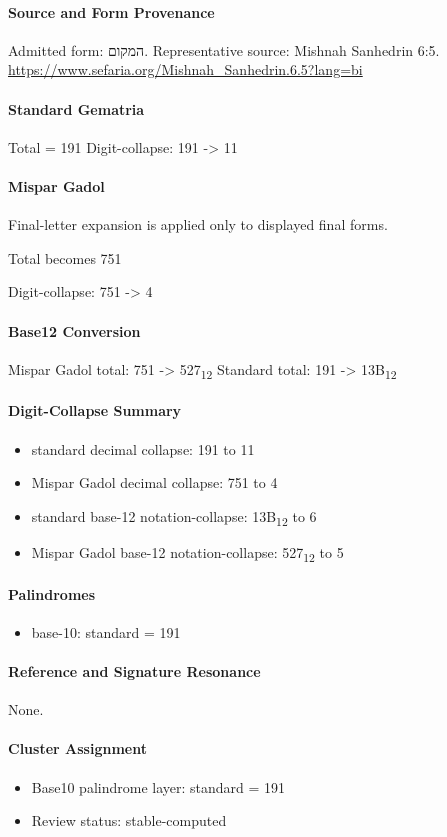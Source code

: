 \paragraph{Source and Form Provenance}
Admitted form: המקום.
Representative source: Mishnah Sanhedrin 6:5.
\url{https://www.sefaria.org/Mishnah_Sanhedrin.6.5?lang=bi}
\paragraph{Standard Gematria}
Total = 191
Digit-collapse: 191 -> 11
\paragraph{Mispar Gadol}
Final-letter expansion is applied only to displayed final forms.

Total becomes 751

Digit-collapse: 751 -> 4
\paragraph{Base12 Conversion}
Mispar Gadol total: 751 -> 527\textsubscript{12}
Standard total: 191 -> 13B\textsubscript{12}
\paragraph{Digit-Collapse Summary}
\begin{itemize}
\item standard decimal collapse: 191 to 11
\item Mispar Gadol decimal collapse: 751 to 4
\item standard base-12 notation-collapse: 13B\textsubscript{12} to 6
\item Mispar Gadol base-12 notation-collapse: 527\textsubscript{12} to 5
\end{itemize}
\paragraph{Palindromes}
\begin{itemize}
\item base-10: standard = 191
\end{itemize}
\paragraph{Reference and Signature Resonance}
None.
\paragraph{Cluster Assignment}
\begin{itemize}
\item Base10 palindrome layer: standard = 191
\item Review status: stable-computed
\end{itemize}
